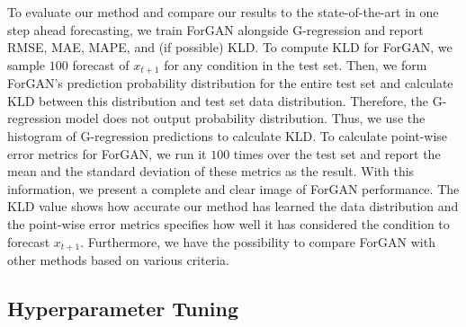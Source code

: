 \documentclass{ieeeaccess}
\begin{document}
To evaluate our method and compare our results to the state-of-the-art in one step ahead forecasting, we train ForGAN alongside G-regression and report RMSE, MAE, MAPE, and (if possible) KLD. To compute KLD for ForGAN, we sample $100$ forecast of $x_{t+1}$ for any condition in the test set. Then, we form ForGAN's prediction probability distribution for the entire test set and calculate KLD between this distribution and test set data distribution. Therefore, the G-regression model does not output probability distribution. Thus, we use the histogram of G-regression predictions to calculate KLD. To calculate point-wise error metrics for ForGAN, we run it $100$ times over the test set and report the mean and the standard deviation of these metrics as the result. With this information, we present a complete and clear image of ForGAN performance. The KLD value shows how accurate our method has learned the data distribution and the point-wise error metrics specifies how well it has considered the condition to forecast $x_{t+1}$. Furthermore, we have the possibility to compare ForGAN with other methods based on various criteria.
\subsection{Hyperparameter Tuning}
\label{sec:hp_tune}
\end{document}
